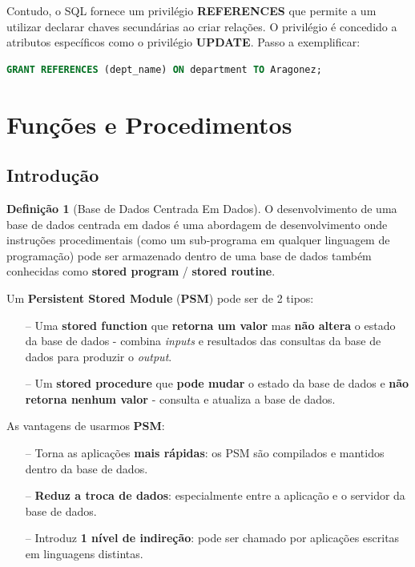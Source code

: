 \documentclass[oneside]{book}
\theoremstyle{definition}
\newtheorem{definition}{Definição}
\begin{document}
Contudo, o SQL fornece um privilégio \textbf{REFERENCES} que permite a um utilizar declarar chaves secundárias ao criar relações. O privilégio é concedido a atributos específicos como o privilégio \textbf{UPDATE}. Passo a exemplificar:
\begin{lstlisting}[language=SQL, morekeywords={REFERENCES, TO}, framesep=8pt, xleftmargin=40pt, framexleftmargin=40pt, frame=tb, framerule=0pt]
GRANT REFERENCES (dept_name) ON department TO Aragonez;
\end{lstlisting}

\section{Funções e Procedimentos}
\subsection{Introdução}
\begin{definition}[Base de Dados Centrada Em Dados]
    O desenvolvimento de uma base de dados centrada em dados é uma abordagem de desenvolvimento onde instruções procedimentais (como um sub-programa em qualquer linguagem de programação) pode ser armazenado dentro de uma base de dados também conhecidas como \textbf{stored program} / \textbf{stored routine}.
\end{definition}

Um \textbf{Persistent Stored Module} (\textbf{PSM}) pode ser de 2 tipos:
\begin{itemize}
    \itemsep0cm
    \item[--] Uma \textbf{stored function} que \textbf{retorna um valor} mas \textbf{não altera} o estado da base de dados - combina \textit{inputs} e resultados das consultas da base de dados para produzir o \textit{output}.
    \item[--] Um \textbf{stored procedure} que \textbf{pode mudar} o estado da base de dados e \textbf{não retorna nenhum valor} - consulta e atualiza a base de dados.
\end{itemize}

As vantagens de usarmos \textbf{PSM}:
\begin{itemize}
    \itemsep0cm
    \item[--] Torna as aplicações \textbf{mais rápidas}: os PSM são compilados e mantidos dentro da base de dados.
    \item[--] \textbf{Reduz a troca de dados}: especialmente entre a aplicação e o servidor da base de dados.
    \item[--] Introduz \textbf{1 nível de indireção}: pode ser chamado por aplicações escritas em linguagens distintas.
\end{itemize}
\end{document}
